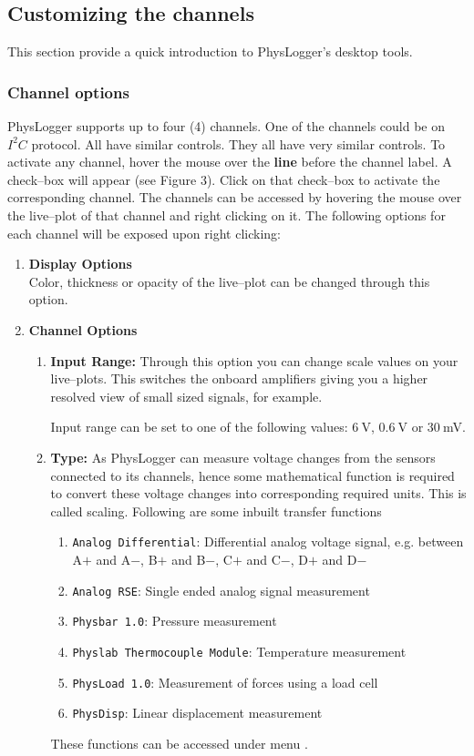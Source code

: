 \documentclass[12pt,oneside,a4]{article}
\begin{document}
\subsection{Customizing the channels}
This section provide a quick introduction to PhysLogger’s desktop tools.
\subsubsection{Channel options}
    PhysLogger supports up to four (4) channels. One of the channels could be on $I^2C$ protocol. All have similar controls. They all have very similar controls.
     To activate any channel, hover the mouse over the \textbf{line} before the channel label. A check--box will appear (see Figure 3). Click on that check--box to activate the corresponding channel.
     The channels can be accessed by hovering the mouse over the live--plot of that channel and right clicking on it. The following options for each channel will be exposed upon right clicking:
\begin{enumerate}
    \item \textbf{Display Options}\\
Color, thickness or opacity of the live--plot can be changed through this option.
    \item \textbf{Channel Options} 
    \begin{enumerate}
        \item \textbf{Input Range:} Through this option you can change scale values on your live--plots. This switches the onboard amplifiers giving you a higher resolved view of small sized signals, for example.
        \begin{leftbar}
        Input range can be set to one of the following values: $6~$V, $0.6~$V or $30~$mV.
        \end{leftbar}
        \item \textbf{Type:} As PhysLogger can measure voltage changes from the sensors connected to its channels, hence some mathematical function is required to convert these voltage changes into corresponding required units. This is called scaling.
        Following are some inbuilt transfer functions
        \begin{enumerate}
            \item \texttt{Analog Differential}: Differential analog voltage signal, e.g. between A$+$ and A$-$, B$+$ and B$-$, C$+$ and C$-$, D$+$ and D$-$
            \item \texttt{Analog RSE}: Single ended analog signal measurement
            \item \texttt{Physbar 1.0}: Pressure measurement
            \item \texttt{Physlab Thermocouple Module}:
            Temperature measurement
            \item \texttt{PhysLoad 1.0}: Measurement of forces using a load cell
            \item \texttt{PhysDisp}: Linear displacement measurement
        \end{enumerate}
        These functions can be accessed under menu .
    \end{enumerate}
\end{enumerate}
\end{document}
